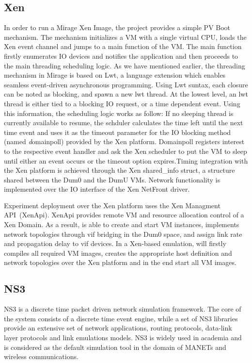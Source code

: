 \subsection{Xen}

In order to run a Mirage Xen Image, the project provides a simple PV Boot
mechanism. The mechanism initializes a VM with a single virtual CPU, loads the
Xen event channel and jumps to a main function of the VM. The main function
firstly enumerates IO devices and notifies the application and then proceeds to the
main threading scheduling logic. As we have mentioned earlier, the threading
mechanism in Mirage is based on Lwt, a language extension which enables seamless
event-driven asynchronous programming. Using Lwt suntax, each closure can be
noted as blocking, and spawn a new lwt thread. At the lowest level, an lwt
thread is either tied to a blocking IO request, or a time dependent event. Using
this information, the scheduling logic works as follow: If no sleeping thread
is currently available to resume, the schduler calculates the
time left until the next time event and uses it as the timeout parameter for the
IO blocking method (named {\emph domainpoll}) provided by the Xen platform.
Domainpoll registers interest to the respective event handler and ask the Xen
scheduler to put the VM to sleep until either an event occurs or the timeout
option expires.Timing integration with the Xen platform is achieved through the Xen
shared\_info struct, a structure shared between the Dum0 and the DumU VMs. 
Network functionality is implemented over the IO interface of
the Xen NetFront driver.

Experiment deployment over the Xen platform uses the Xen Managment API~(XenApi).
XenApi provides remote VM and resource allocation control of a Xen Domain. As a
result, \sdnsim is able to create and start VM instances, implements network
topologies through vif bridging in the Dum0 space, and assign link rate and
propagation delay to vif devices.  In a Xen-based emulation, \sdnsim  will
firstly compiles all required VM images, creates the appropriate host definition
and network topologies over the Xen platform and in the end start all VM images.

\subsection{NS3}

NS3 is a discrete time packet driven network simulation framework. The core of
the system consists of a discrete time event engine, while a set of NS3
libraries provide an extensive set of network applications, routing protocols,
data-link layer protocols and link emulations models. NS3 is widely used in
academia and is considered as the default simulation tool in the domain of
MANETs and wireless communications. 

